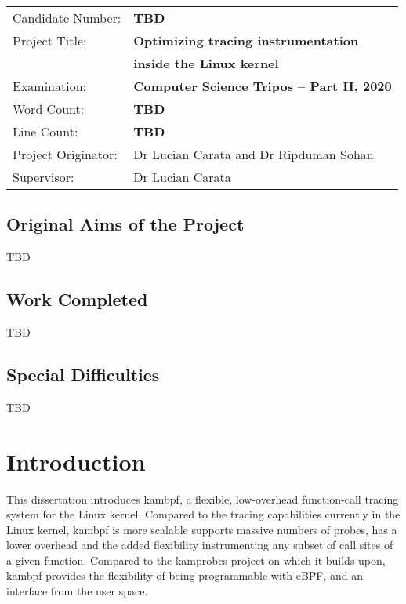 \documentclass[12pt,twoside,notitlepage]{report}
\begin{document}
{\large
\begin{tabular}{ll}
Candidate Number:   & \bf TBD                   \\
Project Title:      & \bf Optimizing tracing instrumentation \\
                    & \bf inside the Linux kernel \\
Examination:        & \bf Computer Science Tripos -- Part II, 2020      \\
Word Count:         & \bf TBD \\
Line Count:         & \bf TBD \\
Project Originator: & Dr Lucian Carata and Dr Ripduman Sohan     \\
Supervisor:         & Dr Lucian Carata                  \\ 
\end{tabular}
}


\section*{Original Aims of the Project}
TBD


\section*{Work Completed}
TBD

\section*{Special Difficulties}
TBD


\tableofcontents

\listoffigures


\cleardoublepage        %

\setcounter{page}{1}
\pagestyle{headings}

\chapter{Introduction}
    This dissertation introduces kambpf, a flexible, low-overhead function-call tracing system for the Linux kernel. Compared to the tracing capabilities currently in the Linux kernel, kambpf is more scalable supports massive numbers of probes, has a lower overhead and the added flexibility instrumenting any subset of call sites of a given function. Compared to the kamprobes project on which it builds upon, kambpf provides the flexibility of being programmable with eBPF, and an interface from the user space. 
\end{document}
